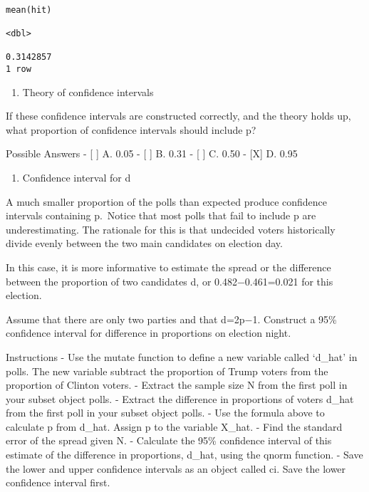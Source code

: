 \documentclass[
]{article}
\providecommand{\tightlist}{%
  \setlength{\itemsep}{0pt}\setlength{\parskip}{0pt}}
\begin{document}
\begin{verbatim}
                                                                        mean(hit)
                                                                        <dbl>
                                                                        0.3142857
1 row
\end{verbatim}

\begin{enumerate}
\def\labelenumi{\arabic{enumi}.}
\setcounter{enumi}{3}
\tightlist
\item
  Theory of confidence intervals
\end{enumerate}

If these confidence intervals are constructed correctly, and the theory
holds up, what proportion of confidence intervals should include p?

Possible Answers - {[} {]} A. 0.05 - {[} {]} B. 0.31 - {[} {]} C. 0.50 -
{[}X{]} D. 0.95

\begin{enumerate}
\def\labelenumi{\arabic{enumi}.}
\setcounter{enumi}{4}
\tightlist
\item
  Confidence interval for d
\end{enumerate}

A much smaller proportion of the polls than expected produce confidence
intervals containing p.~Notice that most polls that fail to include p
are underestimating. The rationale for this is that undecided voters
historically divide evenly between the two main candidates on election
day.

In this case, it is more informative to estimate the spread or the
difference between the proportion of two candidates d, or
0.482−0.461=0.021 for this election.

Assume that there are only two parties and that d=2p−1. Construct a 95\%
confidence interval for difference in proportions on election night.

Instructions - Use the mutate function to define a new variable called
`d\_hat' in polls. The new variable subtract the proportion of Trump
voters from the proportion of Clinton voters. - Extract the sample size
N from the first poll in your subset object polls. - Extract the
difference in proportions of voters d\_hat from the first poll in your
subset object polls. - Use the formula above to calculate p from d\_hat.
Assign p to the variable X\_hat. - Find the standard error of the spread
given N. - Calculate the 95\% confidence interval of this estimate of
the difference in proportions, d\_hat, using the qnorm function. - Save
the lower and upper confidence intervals as an object called ci. Save
the lower confidence interval first.
\end{document}
